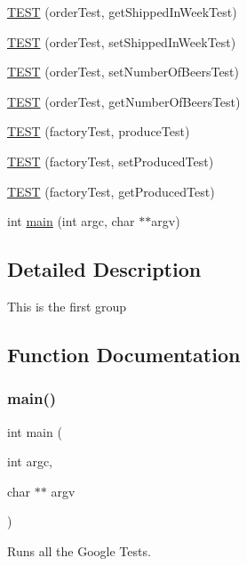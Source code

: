 \begin{DoxyCompactItemize}
\item 
\hyperlink{group__group2_ga49212cac71e8668f4cfc4e3f9120d41c}{T\+E\+ST} (order\+Test, get\+Shipped\+In\+Week\+Test)
\item 
\hyperlink{group__group2_ga3a123025e9d4927197994e1ee8cc2cec}{T\+E\+ST} (order\+Test, set\+Shipped\+In\+Week\+Test)
\item 
\hyperlink{group__group2_ga42cb3c35c8e002551bde5a8786aaa5ea}{T\+E\+ST} (order\+Test, set\+Number\+Of\+Beers\+Test)
\item 
\hyperlink{group__group2_ga5a13e663e9cd26f34be5170a22834f92}{T\+E\+ST} (order\+Test, get\+Number\+Of\+Beers\+Test)
\item 
\hyperlink{group__group2_gad5f9adbefad0030a7a205362bc7caf61}{T\+E\+ST} (factory\+Test, produce\+Test)
\item 
\hyperlink{group__group2_gae393c27ace3356d6d073f20d39c105d7}{T\+E\+ST} (factory\+Test, set\+Produced\+Test)
\item 
\hyperlink{group__group2_ga043b3bbddca3d76940b04e53d2af6628}{T\+E\+ST} (factory\+Test, get\+Produced\+Test)
\item 
int \hyperlink{group__group2_ga3c04138a5bfe5d72780bb7e82a18e627}{main} (int argc, char $\ast$$\ast$argv)
\end{DoxyCompactItemize}


\subsection{Detailed Description}
This is the first group 

\subsection{Function Documentation}
\mbox{\label{group__group2_ga3c04138a5bfe5d72780bb7e82a18e627}} 
\subsubsection{\texorpdfstring{main()}{main()}}
{\footnotesize\ttfamily int main (\begin{DoxyParamCaption}\item[{int}]{argc,  }\item[{char $\ast$$\ast$}]{argv }\end{DoxyParamCaption})}

Runs all the Google Tests. \mbox{\label{group__group2_gaf1d0667641723a1a5714c93a5e3ab030}} 
